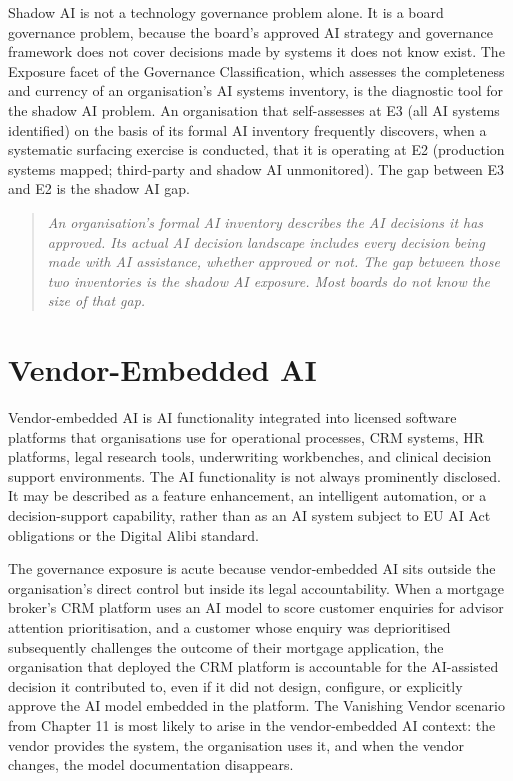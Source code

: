 Shadow AI is not a technology governance problem alone. It is a board governance problem, because the board's approved AI strategy and governance framework does not cover decisions made by systems it does not know exist. The Exposure facet of the Governance Classification, which assesses the completeness and currency of an organisation's AI systems inventory, is the diagnostic tool for the shadow AI problem. An organisation that self-assesses at E3 (all AI systems identified) on the basis of its formal AI inventory frequently discovers, when a systematic surfacing exercise is conducted, that it is operating at E2 (production systems mapped; third-party and shadow AI unmonitored). The gap between E3 and E2 is the shadow AI gap.

\begin{quote}
\emph{An organisation's formal AI inventory describes the AI decisions it has approved. Its actual AI decision landscape includes every decision being made with AI assistance, whether approved or not. The gap between those two inventories is the shadow AI exposure. Most boards do not know the size of that gap.}
\end{quote}

\section{Vendor-Embedded AI}

Vendor-embedded AI is AI functionality integrated into licensed software platforms that organisations use for operational processes, CRM systems, HR platforms, legal research tools, underwriting workbenches, and clinical decision support environments. The AI functionality is not always prominently disclosed. It may be described as a feature enhancement, an intelligent automation, or a decision-support capability, rather than as an AI system subject to EU AI Act obligations or the Digital Alibi standard.

The governance exposure is acute because vendor-embedded AI sits outside the organisation's direct control but inside its legal accountability. When a mortgage broker's CRM platform uses an AI model to score customer enquiries for advisor attention prioritisation, and a customer whose enquiry was deprioritised subsequently challenges the outcome of their mortgage application, the organisation that deployed the CRM platform is accountable for the AI-assisted decision it contributed to, even if it did not design, configure, or explicitly approve the AI model embedded in the platform. The Vanishing Vendor scenario from Chapter 11 is most likely to arise in the vendor-embedded AI context: the vendor provides the system, the organisation uses it, and when the vendor changes, the model documentation disappears.

